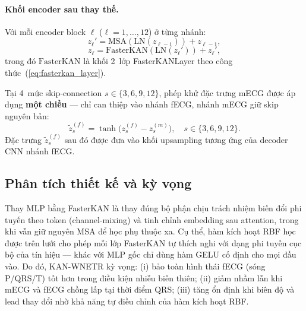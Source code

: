 \documentclass[../DoAn.tex]{subfiles}
\begin{document}
\paragraph{Khối encoder sau thay thế.}
Với mỗi encoder block $\ell$ ($\ell = 1, \dots, 12$) ở từng nhánh:
\begin{equation}
  z_\ell' = \mathrm{MSA}(\mathrm{LN}(z_{\ell-1})) + z_{\ell-1},
\end{equation}
\begin{equation}
  z_\ell = \mathrm{FasterKAN}(\mathrm{LN}(z_\ell')) + z_\ell',
\end{equation}
trong đó $\mathrm{FasterKAN}$ là khối 2~lớp FasterKANLayer theo công thức~(\ref{eq:fasterkan_layer}).

Tại 4~mức skip-connection $s \in \{3, 6, 9, 12\}$, phép khử đặc trưng mECG được áp dụng \textbf{một chiều} --- chỉ can thiệp vào nhánh fECG, nhánh mECG giữ skip nguyên bản:
\begin{equation}
  \tilde{z}_s^{(f)} = \tanh\big(z_s^{(f)} - z_s^{(m)}\big),
  \quad s \in \{3,6,9,12\}.
\end{equation}
Đặc trưng $\tilde{z}_s^{(f)}$ sau đó được đưa vào khối upsampling tương ứng của decoder CNN nhánh fECG.

\subsection{Phân tích thiết kế và kỳ vọng}

Thay MLP bằng FasterKAN là thay đúng bộ phận chịu trách nhiệm biến đổi phi tuyến theo token (channel-mixing) và tinh chỉnh embedding sau attention, trong khi vẫn giữ nguyên MSA để học phụ thuộc xa. Cụ thể, hàm kích hoạt RBF học được trên lưới cho phép mỗi lớp FasterKAN tự thích nghi với dạng phi tuyến cục bộ của tín hiệu --- khác với MLP gốc chỉ dùng hàm GELU cố định cho mọi đầu vào. Do đó, KAN-WNETR kỳ vọng: (i) bảo toàn hình thái fECG (sóng P/QRS/T) tốt hơn trong điều kiện nhiễu biến thiên; (ii) giảm nhầm lẫn khi mECG và fECG chồng lấp tại thời điểm QRS; (iii) tăng ổn định khi biên độ và lead thay đổi nhờ khả năng tự điều chỉnh của hàm kích hoạt RBF.
\end{document}
